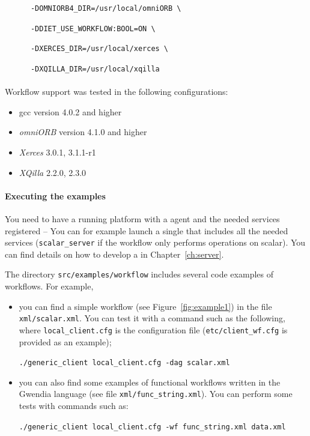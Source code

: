 \begin{itemize}
\verb|      -DOMNIORB4_DIR=/usr/local/omniORB \|

\verb|      -DDIET_USE_WORKFLOW:BOOL=ON \|

\verb|      -DXERCES_DIR=/usr/local/xerces \|

\verb|      -DXQILLA_DIR=/usr/local/xqilla|

\paragraph{}
Workflow support was tested in the following configurations:

\begin{itemize}
\item gcc version 4.0.2 and higher
\item \textit{omniORB} version 4.1.0 and higher
\item \textit{Xerces} 3.0.1, 3.1.1-r1
\item \textit{XQilla} 2.2.0, 2.3.0
\end{itemize}
\end{itemize}

\paragraph{Executing the examples}
\label{sec:wf_examples}

You need to have a running \diet platform with a \madag agent and the needed
services registered -- You can for example launch a single \sed that includes
all the needed services (\eg \texttt{scalar\_server} if the workflow only
performs operations on scalar). You can find details on how to develop a \sed
in Chapter~\ref{ch:server}.

The directory \texttt{src/examples/workflow} includes several code examples of
workflows. For example,
\begin{itemize}
\item you can find a simple \DAG workflow (see Figure~\ref{fig:example1}) in
  the file \texttt{xml/scalar.xml}. You can test it with a command such as the
  following, where \texttt{local\_client.cfg} is the \diet configuration file
  (\texttt{etc/client\_wf.cfg} is provided as an example);

\verb|./generic_client local_client.cfg -dag scalar.xml |

\item you can also find some examples of functional workflows written in the
  Gwendia language (see file \texttt{xml/func\_string.xml}). You can perform
  some tests with commands such as:

  \verb|./generic_client local_client.cfg -wf func_string.xml data.xml |

\end{itemize}

